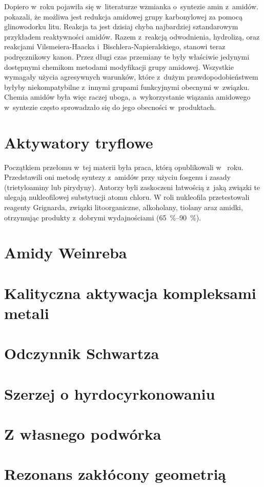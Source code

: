 Dopiero w~roku \citeyear{brown48} pojawiła się w~literaturze wzmianka o~syntezie amin z~amidów.
\citeauthor{brown48} pokazali, że możliwa jest redukcja amidowej grupy karbonylowej za pomocą glinowodorku litu\autocite{brown48}.
Reakcja ta jest dzisiaj chyba najbardziej sztandarowym przykładem reaktywności amidów.
Razem z~reakcją odwodnienia, hydrolizą, oraz reakcjami Vilsmeiera-Haacka i~Bischlera-Napieralskiego,
stanowi teraz podręcznikowy kanon.
Przez długi czas przemiany te były właściwie jedynymi dostępnymi chemikom metodami modyfikacji grupy amidowej.
Wszystkie wymagały użycia agresywnych warunków,
które z~dużym prawdopodobieństwem byłyby niekompatybilne z~innymi grupami funkcyjnymi obecnymi w~związku.
Chemia amidów była więc raczej uboga, a~wykorzystanie wiązania amidowego w~syntezie często sprowadzało się do jego obecności w~produktach.

\section{Aktywatory tryflowe}
Początkiem przełomu w~tej materii była praca, którą opublikowali \citeauthor{ghosez69} w~\citeyear{ghosez69} roku.
Przedstawili oni metodę syntezy  z~amidów przy użyciu fosgenu i zasady (trietyloaminy lub pirydyny)\autocite{ghosez69}.
Autorzy byli zaskoczeni łatwością z~jaką związki te ulegają nukleofilowej substytucji atomu chloru.
W roli nukleofila przetestowali reagenty Grignarda, związki litoorganiczne, alkoholany, tiolany araz amidki,
otrzymując produkty z~dobrymi wydajnościami (\SIrange{65}{90}{\percent}).

\section{Amidy Weinreba}


\section{Kalityczna aktywacja kompleksami metali}

\section{Odczynnik Schwartza}

\section{Szerzej o hyrdocyrkonowaniu}

\section{Z własnego podwórka}

\section{Rezonans zakłócony geometrią}
